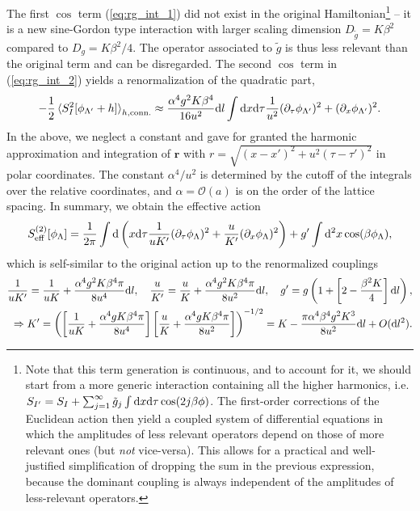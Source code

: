 The first $\cos$ term (\cref{eq:rg_int_1}) did not exist in the original Hamiltonian\footnote{
    Note that this term generation is continuous, and to account for it, we should start from a more generic interaction containing all the higher harmonics, i.e. $S_{I'} = S_I + \sum_{j=1}^\infty \tilde g_j\int\mathrm d x\mathrm d\tau\cos(2j\beta\phi)$.
    The first-order corrections of the Euclidean action then yield a coupled system of differential equations in which the amplitudes of less relevant operators depend on those of more relevant ones (but {\it not} vice-versa).
    This allows for a practical and well-justified simplification of dropping the sum in the previous expression, because the dominant coupling is always independent of the amplitudes of less-relevant operators.
} -- it is a new sine-Gordon type interaction with larger scaling dimension $D_{\tilde g} = K\beta^2$ compared to $D_g=K\beta^2/4$.
The operator associated to $\tilde g$ is thus less relevant than the original term and can be disregarded.
The second $\cos$ term in (\cref{eq:rg_int_2}) yields a renormalization of the quadratic part,
\begin{align}
    -\frac12\braket{S^2_I[\phi_{\Lambda'}+h]}_{h,{\rm conn.}}
    \approx
    \frac{\alpha^4 g^2K\beta^4}{16u^2}\mathrm d l\int\mathrm d x\mathrm d\tau\frac1{u^2}(\partial_
    \tau\phi_{\Lambda'})^2+(\partial_x\phi_{\Lambda'})^2.
    \label{eq:RG_second_order_approximation}
\end{align}
In the above, we neglect a constant and gave for granted the harmonic approximation and integration of $\bm r$ with $r=\sqrt{(x-x')^2+u^2(\tau-\tau')^2}$ in polar coordinates.
The constant $\alpha^4/u^2$ is determined by the cutoff of the integrals over the relative coordinates, and $\alpha=\mathcal O(a)$ is on the order of the lattice spacing.
In summary, we obtain the effective action
\begin{align}
    S_{\rm eff}^{(2)}[\phi_\Lambda] = \frac1{2\pi}\int\mathrm d\left(  x\mathrm d\tau\frac{1}{uK'}(\partial_\tau\phi_\Lambda)^2 + \frac{u}{K'}(\partial_x\phi_\Lambda)^2 \right) +  g'\int\mathrm d^2 x\cos(\beta\phi_\Lambda),
\end{align}
which is self-similar to the original action up to the renormalized couplings
\begin{align}
    \frac1{uK'}=\frac1{uK}+\frac{\alpha^4 g^2 K\beta^4\pi}{8 u^4}\mathrm d l,
    \quad
    \frac u{K'}=\frac u{K}+\frac{\alpha^4 g^2 K\beta^4\pi}{8u^2}\mathrm d l,
    \quad
    g' = g\left( 1 + \left[ 2-\frac{\beta^2 K}4 \right]\mathrm d l \right),
    \\
    \Rightarrow
    K' = \left( \left[ \frac{1}{uK}+\frac{\alpha^4 g K\beta^4\pi}{8u^4} \right]\left[ \frac{u}{K}+\frac{\alpha^4 g K\beta^4\pi}{8u^2} \right] \right)^{-1/2}
    =
    K-\frac{\pi \alpha^4 \beta^4 g^2 K^3}{8u^2}\mathrm d l + O(\mathrm d l^2).
\end{align}

